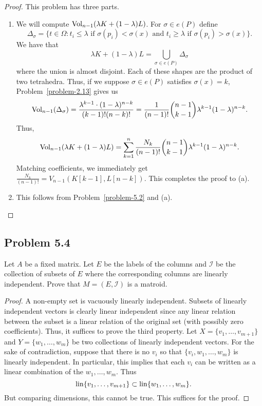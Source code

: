 \documentclass[12pt]{article}
\begin{document}
\begin{proof}
	This problem has three parts. 
	\begin{enumerate}[label = (\alph*)]
		\item We will compute $\operatorname{Vol}_{n-1}(\lambda K + (1 - \lambda) L)$. For $\sigma \in e(P)$ define 
		\[	
			\Delta_\sigma = \{t \in \Omega : t_i \leq \lambda \text{ if $\sigma(p_i) < \sigma(x)$ and $t_i \geq \lambda$ if $\sigma(p_i) > \sigma(x)$}\}.
		\]
		We have that 
		\[
			\lambda K + (1-\lambda) L = \bigcup_{\sigma \in e(P)} \Delta_\sigma
		\]
		where the union is almost disjoint. Each of these shapes are the product of two tetrahedra. Thus, if we suppose $\sigma \in e(P)$ satisfies $\sigma(x) = k$, Problem~\ref{problem-2.13} gives us 
		\[
			\operatorname{Vol}_{n-1}(\Delta_\sigma) = \frac{\lambda^{k-1} \cdot (1 - \lambda)^{n-k}}{(k-1)! (n-k)!} = \frac{1}{(n-1)!} \binom{n-1}{k-1} \lambda^{k-1} (1 - \lambda)^{n-k}.
		\]
		Thus, 
		\[
			\operatorname{Vol}_{n-1}(\lambda K + (1-\lambda) L) = \sum_{k = 1}^n \frac{N_k}{(n-1)!} \binom{n-1}{k-1} \lambda^{k-1} (1-\lambda)^{n-k}.
		\]
		Matching coefficients, we immediately get $\frac{N_k}{(n-1)!} = V_{n-1}(K[k-1], L[n-k])$. This completes the proof to (a). 

		\item This follows from Problem~\ref{problem-5.2} and (a). 
	\end{enumerate}
\end{proof}

\newpage 

\subsection{Problem 5.4}

\begin{problem}
	Let $A$ be a fixed matrix. Let $E$ be the labels of the columns and $\mathcal{I}$ be the collection of subsets of $E$ where the corresponding columns are linearly independent. Prove that $M = (E, \mathcal{I})$ is a matroid. 
\end{problem}

\begin{proof}
	A non-empty set is vacuously linearly independent. Subsets of linearly independent vectors is clearly linear independent since any linear relation between the subset is a linear relation of the original set (with possibly zero coefficients). Thus, it suffices to prove the third property. Let $X = \{v_1, \ldots, v_{m+1}\}$ and $Y = \{w_1, \ldots, w_m\}$ be two collections of linearly independent vectors. For the sake of contradiction, suppose that there is no $v_i$ so that $\{v_i, w_1, \ldots, w_m\}$ is linearly independent. In particular, this implies that each $v_i$ can be written as a linear combination of the $w_1, \ldots, w_m$. Thus
	\[
		\operatorname{lin} \{v_1, \ldots, v_{m+1}\} \subset \operatorname{lin} \{w_1, \ldots, w_m\}.
	\]
	But comparing dimensions, this cannot be true. This suffices for the proof. 
\end{proof}
\end{document}
